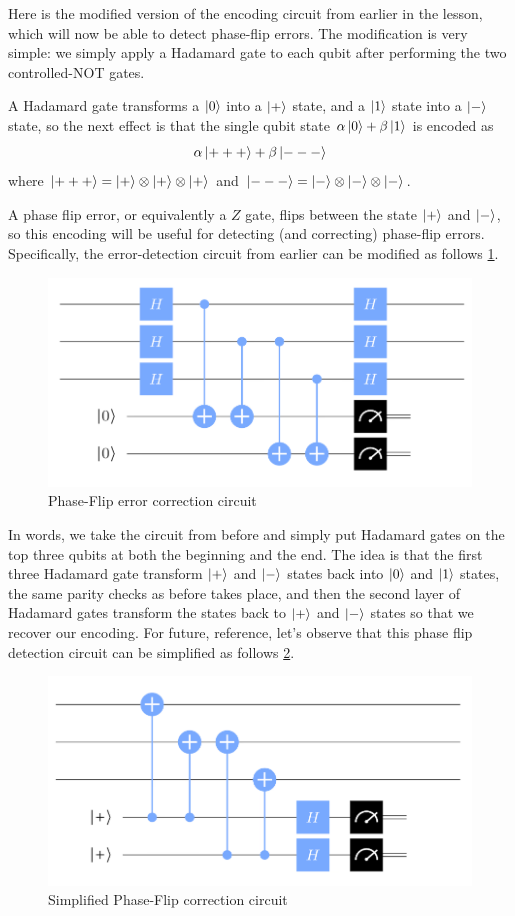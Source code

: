 \documentclass[12pt, oneside]{book}
\theoremstyle{definition}
\theoremstyle{definition}
\theoremstyle{remark}
\begin{document}
Here is the modified version of the encoding circuit from earlier in the lesson, which will now be able to detect phase-flip errors. The modification is very simple: we simply apply a Hadamard gate to each qubit after performing the two controlled-NOT gates.

A Hadamard gate transforms a $\ket{0}$ into a $\ket{+}$ state, and a $\ket{1}$ state into a $\ket{-}$ state, so the next effect is that the single qubit state $\alpha\ket{0}+\beta\ket{1}$ is encoded as
\[
\alpha\ket{+++}+\beta\ket{---}
\]
where $\ket{+++}=\ket{+}\otimes \ket{+}\otimes \ket{+}$ and $\ket{---}=\ket{-}\otimes\ket{-}\otimes\ket{-}$.

A phase flip error, or equivalently a $Z$ gate, flips between the state $\ket{+}$ and $\ket{-}$, so this encoding will be useful for detecting (and correcting) phase-flip errors. Specifically, the error-detection circuit from earlier can be modified as follows \ref{fig:phasefliperr}.
\begin{figure}[ht]
    \centering
    \includegraphics[width=1\linewidth]{../images/phasefliperr.png}
    \caption{Phase-Flip error correction circuit}
    \label{fig:phasefliperr}
\end{figure}
In words, we take the circuit from before and simply put Hadamard gates on the top three qubits at both the beginning and the end. The idea is that the first three Hadamard gate transform $\ket{+}$ and $\ket{-}$ states back into $\ket{0}$ and $\ket{1}$ states, the same parity checks as before takes place, and then the second layer of Hadamard gates transform the states back to $\ket{+}$ and $\ket{-}$ states so that we recover our encoding. For future, reference, let's observe that this phase flip detection circuit can be simplified as follows \ref{fig:phase-fliperr}.
\begin{figure}[ht]
    \centering
    \includegraphics[width=1\linewidth]{../images/phasefliperrorcirc.png}
    \caption{Simplified Phase-Flip correction circuit}
    \label{fig:phase-fliperr}
\end{figure}
\end{document}
